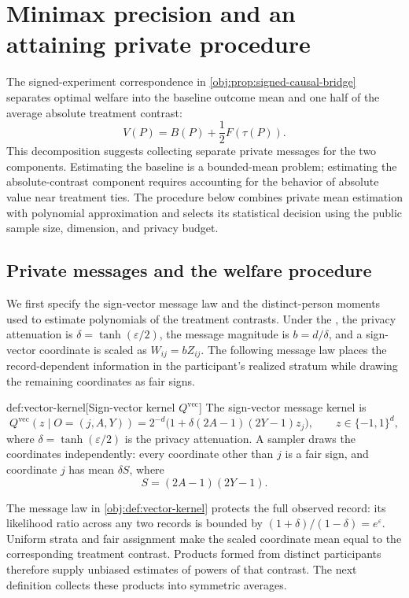 \documentclass[11pt]{article}
\begin{document}
\section{Minimax precision and an attaining private procedure}

The signed-experiment correspondence in \cref{obj:prop:signed-causal-bridge} separates optimal welfare into the baseline outcome mean and one half of the average absolute treatment contrast:
\[
V(P)=B(P)+\frac12F(\tau(P)).
\]
This decomposition suggests collecting separate private messages for the two components. Estimating the baseline is a bounded-mean problem; estimating the absolute-contrast component requires accounting for the behavior of absolute value near treatment ties. The procedure below combines private mean estimation with polynomial approximation and selects its statistical decision using the public sample size, dimension, and privacy budget.

\subsection{Private messages and the welfare procedure}

We first specify the sign-vector message law and the distinct-person moments used to estimate polynomials of the treatment contrasts. Under the , the privacy attenuation is \(\delta=\tanh(\varepsilon/2)\), the message magnitude is \(b=d/\delta\), and a sign-vector coordinate is scaled as \(W_{ij}=bZ_{ij}\). The following message law places the record-dependent information in the participant's realized stratum while drawing the remaining coordinates as fair signs.

\begin{definitionv}{def:vector-kernel}[Sign-vector kernel $Q^{\mathrm{vec}}$]
The sign-vector message kernel is
\[
Q^{\mathrm{vec}}(z\mid O=(j,A,Y))
=
2^{-d}\bigl(1+\delta(2A-1)(2Y-1)z_j\bigr),
\qquad z\in\{-1,1\}^d,
\]
where \(\delta=\tanh(\varepsilon/2)\) is the privacy attenuation. A sampler draws the coordinates independently: every coordinate other than \(j\) is a fair sign, and coordinate \(j\) has mean \(\delta S\), where
\[
S=(2A-1)(2Y-1).
\]
\end{definitionv}

The message law  in \cref{obj:def:vector-kernel} protects the full observed record: its likelihood ratio across any two records is bounded by \((1+\delta)/(1-\delta)=e^\varepsilon\). Uniform strata and fair assignment make the scaled coordinate mean equal to the corresponding treatment contrast. Products formed from distinct participants therefore supply unbiased estimates of powers of that contrast. The next definition collects these products into symmetric averages.
\end{document}
